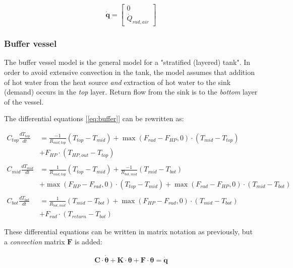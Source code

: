 \begin{equation}
	\mathbf{\dot{q}} =
	\begin{bmatrix}
		0 \\
		\dot{Q}_{rad, air}
	\end{bmatrix}
\end{equation}

\subsubsection{Buffer vessel}

The buffer vessel model is the general model for a "stratified (layered) tank". In order to avoid extensive convection in the tank, the model assumes that addition of hot water from the heat source \emph{and} extraction of hot water to the sink (demand) occurs in the \emph{top} layer.  Return flow from the sink is to the \emph{bottom} layer of the vessel.

The differential equations [\ref{eq:buffer}] can be rewritten as:

{\color{teal}
	\begin{equation}
		\begin{aligned}
			C_{top}\frac{dT_{top}}{dt} &= \frac{-1}{R_{mid, top}} (T_{top}-T_{mid}) + \max(F_{rad}-F_{HP}, 0) \cdot (T_{mid} - T_{top}) \\
			&+ F_{HP} \cdot (T_{HP,out} - T_{top})
			\\ \\
			C_{mid}\frac{dT_{mid}}{dt} &= \frac{1}{R_{mid, top}} (T_{top}-T_{mid}) + \frac{-1}{R_{bot, mid}}(T_{mid}-T_{bot}) \\
			& + \max(F_{HP}-F_{rad}, 0) \cdot (T_{top} - T_{mid}) + \max(F_{rad}-F_{HP}, 0)  \cdot (T_{mid} - T_{bot}) 
			\\ \\
			C_{bot}\frac{dT_{bot}}{dt} &= \frac{1}{R_{bot, mid}} (T_{mid}-T_{bot}) + \max(F_{HP} - F_{rad}, 0) \cdot (T_{mid} - T_{bot})\\
			& + F_{rad} \cdot (T_{return} - T_{bot}) 
		\end{aligned}
	\end{equation}
}

These differential equations can be written in matrix notation as previously, but a \emph{convection} matrix $\mathbf{F}$ is added:

\begin{subequations}
	\label{eq:matnot}
	\begin{align}
		\mathbf{C} \cdot \boldsymbol{\dot{\theta}} + \mathbf{K} \cdot \boldsymbol{\theta} + \mathbf{F} \cdot \boldsymbol{\theta}= \mathbf{\dot{q}}
	\end{align}
\end{subequations}

